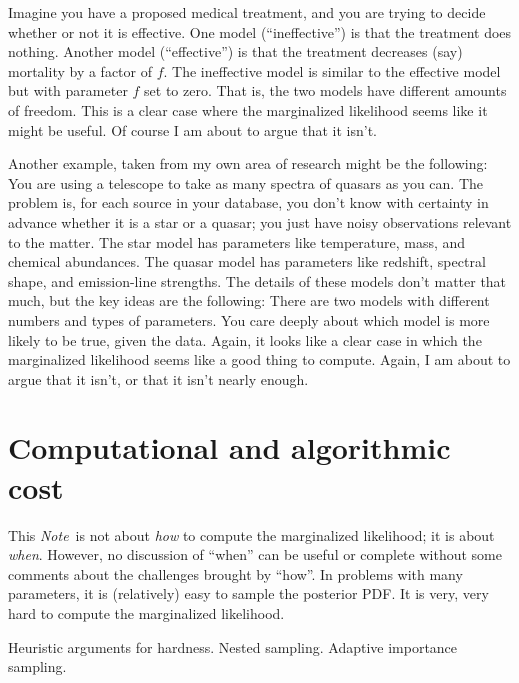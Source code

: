 \documentclass[12pt]{article}
\newcommand{\documentname}{\textsl{Note}}
\begin{document}
Imagine you have a proposed medical treatment,
  and you are trying to decide whether or not it is effective.
One model (``ineffective'') is that the treatment does nothing.
Another model (``effective'') is that the treatment decreases (say) mortality by a factor of $f$.
The ineffective model is similar to the effective model but with parameter $f$ set to zero.
That is, the two models have different amounts of freedom.
This is a clear case where the marginalized likelihood seems like it might be useful.
Of course I am about to argue that it isn't.

Another example, taken from my own area of research might be the following:
You are using a telescope to take as many spectra of quasars as you can.
The problem is, for each source in your database,
  you don't know with certainty in advance whether it is a star or a quasar;
  you just have noisy observations relevant to the matter.
The star model has parameters like temperature, mass, and chemical abundances.
The quasar model has parameters like redshift, spectral shape, and emission-line strengths.
The details of these models don't matter that much, but the key ideas are the following:
There are two models with different numbers and types of parameters.
You care deeply about which model is more likely to be true, given the data.
Again, it looks like a clear case in which the marginalized likelihood seems like a good thing to compute.
Again, I am about to argue that it isn't, or that it isn't nearly enough.


\section{Computational and algorithmic cost}

This \documentname\ is not about \emph{how} to compute the marginalized likelihood;
  it is about \emph{when}.
However, no discussion of ``when'' can be useful or complete without some comments
  about the challenges brought by ``how''.
In problems with many parameters, it is (relatively) easy to sample the posterior PDF.
It is very, very hard to compute the marginalized likelihood.

Heuristic arguments for hardness.
Nested sampling.
Adaptive importance sampling.
\end{document}
